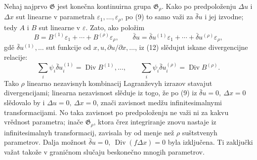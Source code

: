 \documentclass[11pt]{article}
\providecommand{\G}{\mathfrak G}
\providecommand{\eps}{\varepsilon}
\providecommand{\D}{\Delta}
\providecommand{\p}{\partial}
\DeclareMathOperator{\Div}{Div}
\providecommand{\bd}{\bar{\delta}}
\begin{document}
Nehaj najprvo \(\G\) jest konečna kontinuirna grupa \(\G_\rho\). Kako po predpoloženju \(\D u\) i \(\D x\) sut linearne v parametrah \(\eps_1,\ldots,\eps_\rho\), po (9) to samo važi za \(\bd u\) i jej izvodne; tedy \(A\) i \(B\) sut linearne v \(\eps\). Zato, ako položim
\[
B=B^{(1)}\eps_1+\cdots+B^{(\rho)}\eps_\rho,\qquad
\bd u=\bd u^{(1)}\eps_1+\cdots+\bd u^{(\rho)}\eps_\rho,
\]
gdě \(\bd u^{(1)},\ldots\) sut funkcije od \(x,u,\p u/\p x,\ldots\), iz (12) slědujut iskane divergencijne relacije:
\begin{equation}
\sum_i\psi_i\bd u_i^{(1)}=\Div B^{(1)},\ldots,\qquad
\sum_i\psi_i\bd u_i^{(\rho)}=\Div B^{(\rho)}.
\tag{13}
\end{equation}
Tako \(\rho\) linearno nezavisnyh kombinacij Lagranževyh izrazov stavajut divergencijami; linearna nezavisnost slěduje iz togo, že po (9) iz \(\bd u=0,\ \D x=0\) slědovalo by i \(\D u=0,\ \D x=0\), znači zavisnost medžu infinitesimalnymi transformacijami. No taka zavisnost po predpoloženju ne važi ni za kakvu vrědnost parametra; inače \(\G_\rho\), ktora črez integriranje znovu nastaje iz infinitesimalnyh transformacij, zavisala by od menje než \(\rho\) suštstvenyh parametrov. Dalja možnost \(\bd u=0,\ \Div(f\D x)=0\) byla izključena. Ti zaključki važat takože v graničnom slučaju beskonečno mnogih parametrov.
\end{document}
